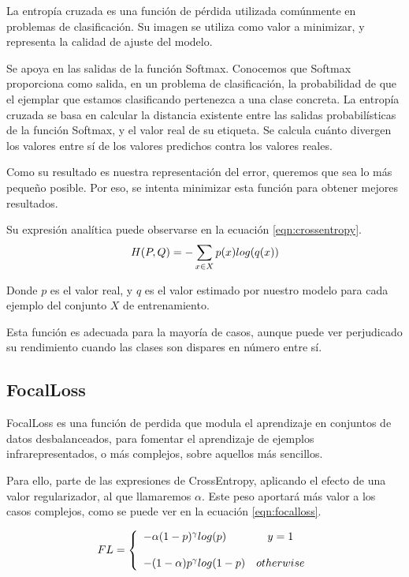La entropía cruzada es una función de pérdida utilizada comúnmente en problemas de clasificación. Su imagen se utiliza como valor a minimizar, y representa la calidad de ajuste del modelo.

Se apoya en las salidas de la función Softmax. Conocemos que Softmax proporciona como salida, en un problema de clasificación, la probabilidad de que el ejemplar que estamos clasificando pertenezca a una clase concreta. La entropía cruzada se basa en calcular la distancia existente entre las salidas probabilísticas de la función Softmax, y el valor real de su etiqueta. Se calcula cuánto divergen los valores entre sí de los valores predichos contra los valores reales.

Como su resultado es nuestra representación del error, queremos que sea lo más pequeño posible. Por eso, se intenta minimizar esta función para obtener mejores resultados.

Su expresión analítica puede observarse en la ecuación \ref{eqn:crossentropy}.
\begin{equation}
	\label{eqn:crossentropy}
	\centering
	H(P,Q)= -\sum_{x \in X}p(x)log(q(x))
\end{equation}

Donde $p$ es el valor real, y $q$ es el valor estimado por nuestro modelo para cada ejemplo del conjunto $X$ de entrenamiento.

Esta función es adecuada para la mayoría de casos, aunque puede ver perjudicado su rendimiento cuando las clases son dispares en número entre sí.

\subsection{FocalLoss}

FocalLoss \cite{lin2018focal} es una función de perdida que modula el aprendizaje en conjuntos de datos desbalanceados, para fomentar el aprendizaje de ejemplos infrarepresentados, o más complejos, sobre aquellos más sencillos.

Para ello, parte de las expresiones de CrossEntropy, aplicando el efecto de una valor regularizador, al que llamaremos $\alpha$. Este peso aportará más valor a los casos complejos, como se puede ver en la ecuación \ref{eqn:focalloss}.

\begin{equation}
	\label{eqn:focalloss}
	\centering
	FL = \left\{ \begin{array}{lcc} -\alpha(1-p)^{\gamma}log(p)& y = 1 \\ 
		\\  -(1-\alpha)p^{\gamma}log(1-p) & otherwise  \\ \end{array} \right.
\end{equation}

